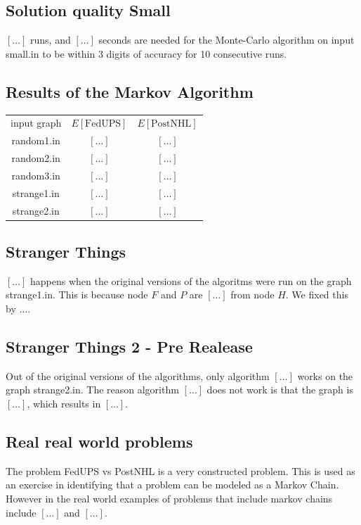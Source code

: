 \documentclass{tufte-handout}
\begin{document}
\subsection{Solution quality Small}

$[\ldots]$ runs, and $[\ldots]$ seconds are needed for the Monte-Carlo algorithm on input small.in to be within $3$ digits of accuracy for 10 consecutive runs.

\subsection{Results of the Markov Algorithm}

\begin{tabular}{c c c}
    input graph & $E[\text{FedUPS}]$ & $E[\text{PostNHL}]$ \\
    random1.in & $[\ldots]$ & $[\ldots]$ \\
    random2.in & $[\ldots]$ & $[\ldots]$ \\
    random3.in & $[\ldots]$ & $[\ldots]$ \\
    strange1.in & $[\ldots]$ & $[\ldots]$ \\
    strange2.in & $[\ldots]$ & $[\ldots]$ \\
\end{tabular}

\subsection{Stranger Things}
$[\ldots]$ happens when the original versions of the algoritms were run on the graph strange1.in. 
This is because node $F$ and $P$ are $[\ldots]$ from node $H$. We fixed this by ${\ldots}$.

\subsection{Stranger Things 2 - Pre Realease}
Out of the original versions of the algorithms, only algorithm $[\ldots]$ works on the graph strange2.in. 
The reason algorithm $[\ldots]$ does not work is that the graph is $[\ldots]$, which results in $[\ldots]$.


\subsection{Real real world problems}
The problem FedUPS vs PostNHL is a very constructed problem. 
This is used as an exercise in identifying that a problem can be modeled as a Markov Chain.
However in the real world examples of problems that include markov chains include $[\ldots]$ and $[\ldots]$.
\end{document}
